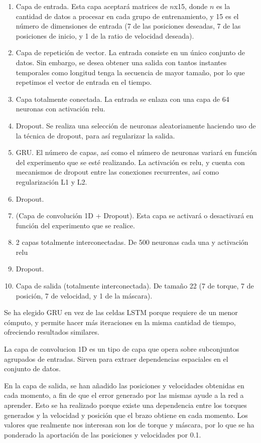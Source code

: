 \begin{enumerate}
	\item Capa de entrada. Esta capa aceptará matrices de $n$x15, donde $n$ es la cantidad de datos a procesar en cada grupo de entrenamiento, y 15 es el número de dimensiones de entrada (7 de las posiciones deseadas, 7 de las posiciones de inicio, y 1 de la ratio de velocidad deseada).
	\item Capa de repetición de vector. La entrada consiste en un único conjunto de datos. Sin embargo, se desea obtener una salida con tantos instantes temporales como longitud tenga la secuencia de mayor tamaño, por lo que repetimos el vector de entrada en el tiempo.
	\item Capa totalmente conectada. La entrada se enlaza con una capa de 64 neuronas con activación relu.
	\item Dropout. Se realiza una selección de neuronas aleatoriamente haciendo uso de la técnica de dropout, para así regularizar la salida.
	\item GRU. El número de capas, así como el número de neuronas variará en función del experimento que se esté realizando. La activación es relu, y cuenta con mecanismos de dropout entre las conexiones recurrentes, así como regularización L1 y L2.
	\item Dropout.
	\item (Capa de convolución 1D + Dropout). Esta capa se activará o desactivará en función del experimento que se realice.
	\item 2 capas totalmente interconectadas. De 500 neuronas cada una y activación relu
	\item Dropout.
	\item Capa de salida (totalmente interconectada). De tamaño 22 (7 de torque, 7 de posición, 7 de velocidad, y 1 de la máscara).
\end{enumerate}

Se ha elegido GRU en vez de las celdas LSTM porque requiere de un menor cómputo, y permite hacer más iteraciones en la misma cantidad de tiempo, ofreciendo resultados similares.

La capa de convolucion 1D es un tipo de capa que opera sobre subconjuntos agrupados de entradas. Sirven para extraer dependencias espaciales en el conjunto de datos.

En la capa de salida, se han añadido las posiciones y velocidades obtenidas en cada momento, a fin de que el error generado por las mismas ayude a la red a aprender. Esto se ha realizado porque existe una dependencia entre los torques generados y la velocidad y posición que el brazo obtiene en cada momento. Los valores que realmente nos interesan son los de torque y máscara, por lo que se ha ponderado la aportación de las posiciones y velocidades por 0.1.

